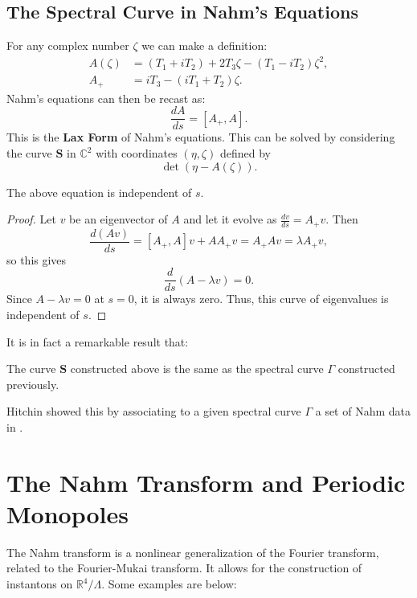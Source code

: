 	\subsection{The Spectral Curve in Nahm's Equations}
	For any complex number $\zeta$ we can make a definition:
	\begin{equation}
		\begin{aligned}
			A(\zeta) &= (T_1 + i T_2) + 2T_3 \zeta - (T_1 - i T_2) \zeta^2,\\
			A_+ &= i T_3 - (i T_1 + T_2 )\zeta.
		\end{aligned}
	\end{equation}
	Nahm's equations can then be recast as:
	\begin{equation}
		\frac{dA}{ds} = [A_+, A].
	\end{equation}
	This is the \textbf{Lax Form} of Nahm's equations.
	This can be solved by considering the curve $\mathbf S$ in $\mathbb C^2$ with coordinates $(\eta, \zeta)$ defined by
	$$\det\left(\eta - A(\zeta) \right).$$
	\begin{prop}
		The above equation is independent of $s$.
	\end{prop}
	\begin{proof}
		Let $v$ be an eigenvector of $A$ and let it evolve as $\frac{dv}{ds}=A_+ v$. Then
		\begin{equation}
			\frac{d(Av)}{ds} = [A_+, A] v + A A_+ v = A_+ A v = \lambda A_+ v,
		\end{equation}
		so this gives
		\begin{equation}
			\frac{d}{ds}(A - \lambda v) = 0.
		\end{equation}
		Since $A - \lambda v = 0$ at $s=0$, it is always zero.
		Thus, this curve of eigenvalues is independent of $s$.
	\end{proof}
	It is in fact a remarkable result that:
	\begin{prop}
		The curve $\mathbf S$ constructed above is the same as the spectral curve $\Gamma$ constructed previously.
	\end{prop}
		Hitchin showed this by associating to a given spectral curve $\Gamma$ a set of Nahm data in \cite{hitchin1983}.



	\section{The Nahm Transform and Periodic Monopoles}

	The Nahm transform is a nonlinear generalization of the Fourier transform, related to the Fourier-Mukai transform. It allows for the construction of instantons on $\mathbb R^4/\Lambda$. Some examples are below:


